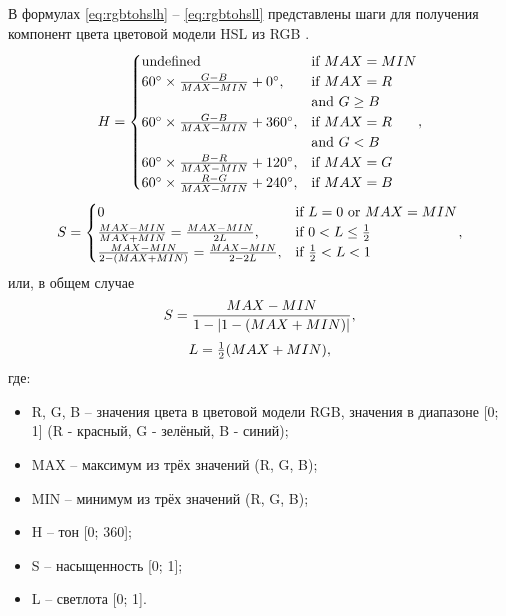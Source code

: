 В формулах \ref{eq:rgbtohslh} -- \ref{eq:rgbtohsll} представлены шаги для получения компонент цвета цветовой модели HSL из RGB \cite{hsl}.
\begin{equation}
	{\label{eq:rgbtohslh}\displaystyle H={\begin{cases}{\mbox{undefined}}&{\mbox{if }}MAX=MIN\\60^{\circ }\times {\frac {G-B}{MAX-MIN}}+0^{\circ },&{\mbox{if }}MAX=R\\&{\mbox{and }}G\geq B\\60^{\circ }\times {\frac {G-B}{MAX-MIN}}+360^{\circ },&{\mbox{if }}MAX=R\\&{\mbox{and }}G<B\\60^{\circ }\times {\frac {B-R}{MAX-MIN}}+120^{\circ },&{\mbox{if }}MAX=G\\60^{\circ }\times {\frac {R-G}{MAX-MIN}}+240^{\circ },&{\mbox{if }}MAX=B\end{cases}},}
\end{equation}
\begin{equation}
	{\label{eq:rgbtohsls0}\displaystyle S={\begin{cases}0&{\mbox{if }}L=0{\mbox{ or }}MAX=MIN\\{\frac {MAX-MIN}{MAX+MIN}}={\frac {MAX-MIN}{2L}},&{\mbox{if }}0<L\leq {\frac {1}{2}}\\{\frac {MAX-MIN}{2-(MAX+MIN)}}={\frac {MAX-MIN}{2-2L}},&{\mbox{if }}{\frac {1}{2}}<L<1\\\end{cases}},}
\end{equation} или, в общем случае
\begin{equation}
	{\label{eq:rgbtohsls1}\displaystyle S={\frac {MAX-MIN}{1-|1-(MAX+MIN)|}},}
\end{equation}
\begin{equation}
	{\label{eq:rgbtohsll}\displaystyle L={\begin{matrix}{\frac {1}{2}}\end{matrix}}(MAX+MIN),}
\end{equation} где:
\begin{itemize}
	\item R, G, B -- значения цвета в цветовой модели RGB, значения в диапазоне [0; 1] (R - красный, G - зелёный, B - синий);
	\item MAX -- максимум из трёх значений (R, G, B);
	\item MIN -- минимум из трёх значений (R, G, B);
	\item H -- тон [0; 360];
	\item S -- насыщенность [0; 1];
	\item L -- светлота [0; 1].
\end{itemize}

